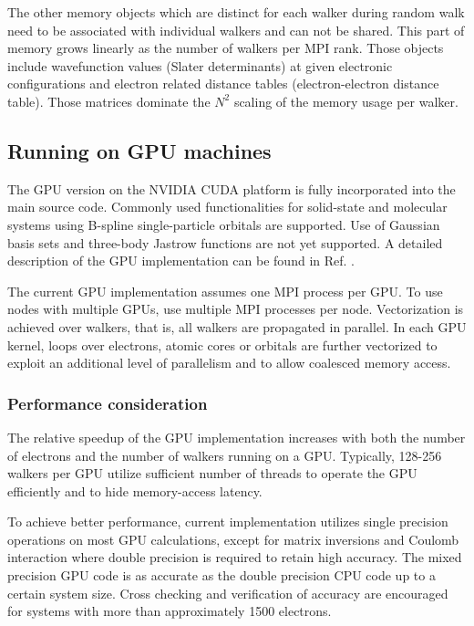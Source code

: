 The other memory objects which are distinct for each walker during random walk need to be associated with individual walkers and can not be shared. This part of memory grows linearly as the number of walkers per MPI rank. Those objects include wavefunction values (Slater determinants) at given electronic configurations and electron related distance tables (electron-electron distance table). Those matrices dominate the $N^2$ scaling of the memory usage per walker.

\subsection{Running on GPU machines}
\label{sec:gpurunning}

The GPU version on the NVIDIA CUDA platform is fully incorporated into
the main source code. Commonly used functionalities for
solid-state and molecular systems using B-spline single-particle
orbitals are supported. Use of Gaussian basis sets and three-body
Jastrow functions are not yet supported. A detailed description of the GPU
implementation can be found in Ref. \cite{EslerKimCeperleyShulenburger2012}.

The current GPU implementation assumes one MPI process per GPU. To use
nodes with multiple GPUs, use multiple MPI processes per node.
Vectorization is achieved over walkers, that is, all walkers are
propagated in parallel. In each GPU kernel, loops over electrons,
atomic cores or orbitals are further vectorized to exploit an
additional level of parallelism and to allow coalesced memory access.


\subsubsection{Performance consideration}
\label{sec:gpu:performance}

The relative speedup of the GPU implementation increases with both the number of electrons and the number of walkers running on a GPU. Typically, 128-256 walkers per GPU utilize sufficient number of threads to operate the GPU efficiently and to hide memory-access latency.

To achieve better performance, current implementation utilizes single precision operations on most GPU calculations, except for matrix inversions and Coulomb interaction where double precision is required to retain high accuracy. The mixed precision GPU code is as accurate as the double precision CPU code up to a certain system size. Cross checking and verification of accuracy are encouraged for systems with more than approximately 1500 electrons.

